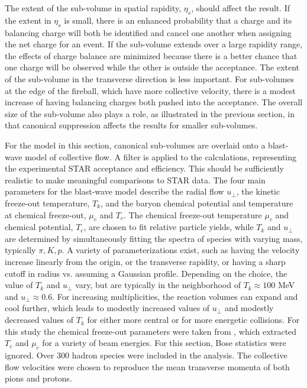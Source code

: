 The extent of the sub-volume in spatial rapidity, $\eta_s$, should affect the result. If the extent in $\eta_s$ is small, there is an enhanced probability that a charge and its balancing charge will both be identified and cancel one another when assigning the net charge for an event. If the sub-volume extends over a large rapidity range, the effects of charge balance are minimized because there is a better chance that one charge will be observed while the other is outside the acceptance. The extent of the sub-volume in the transverse direction is less important. For sub-volumes at the edge of the fireball, which have more collective velocity, there is a modest increase of having balancing charges both pushed into the acceptance. The overall size of the sub-volume also plays a role, as illustrated in the previous section, in that canonical suppression affects the results for smaller sub-volumes. 

For the model in this section, canonical sub-volumes are overlaid onto a blast-wave model of collective flow. A filter is applied to the calculations, representing the experimental STAR acceptance and efficiency. This should be sufficiently realistic to make meaningful comparisons to STAR data. The four main parameters for the blast-wave model describe the radial flow $u_\perp$, the kinetic freeze-out temperature, $T_k$, and the baryon chemical potential and temperature at chemical freeze-out, $\mu_c$ and $T_c$. The chemical freeze-out temperature $\mu_c$ and chemical potential, $T_c$, are chosen to fit relative particle yields, while $T_k$ and $u_\perp$ are determined by simultaneously fitting the spectra of species with varying mass, typically $\pi,K,p$. A variety of parameterizations exist, such as having the velocity increase linearly from the origin, or the transverse rapidity, or having a sharp cutoff in radius vs. assuming a Gaussian profile. Depending on the choice, the value of $T_k$ and $u_\perp$ vary, but are typically in the neighborhood of $T_k\approx 100$ MeV and $u_\perp\approx 0.6$. For increasing multiplicities, the reaction volumes can expand and cool further, which leads to modestly increased values of $u_\perp$ and modestly decreased values of $T_k$ for either more central or for more energetic collisions. For this study the chemical freeze-out parameters were taken from \cite{Das:2012yq,Kumar:2012np}, which extracted $T_c$ and $\mu_c$ for a variety of beam energies. For this section, Bose statistics were ignored. Over 300 hadron species were included in the analysis. The collective flow velocities were chosen to reproduce the mean transverse momenta of both pions and protons.

